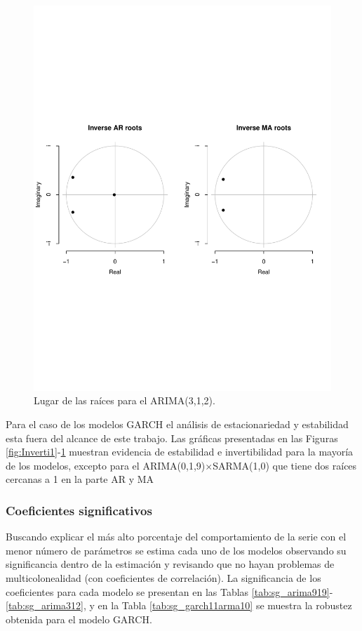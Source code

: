 \documentclass[conference]{IEEEtran}
\begin{document}
\begin{figure}
    \centering
    \includegraphics[width=\columnwidth]{figs/Arima312stationarity.pdf}
    \caption{Lugar de las raíces para el ARIMA(3,1,2).}
    \label{fig:Inverti4}
\end{figure}

Para el caso de los modelos GARCH el análisis de estacionariedad y estabilidad esta fuera del alcance de este trabajo. Las gráficas presentadas en las Figuras \ref{fig:Inverti1}-\ref{fig:Inverti4} muestran evidencia de estabilidad e invertibilidad para la mayoría de los modelos, excepto  para el ARIMA(0,1,9)$\times$SARMA(1,0) que tiene dos raíces cercanas a 1 en la parte AR y MA

\subsubsection{Coeficientes significativos} Buscando explicar el más alto porcentaje del comportamiento  de la serie con el menor número de parámetros se estima cada uno de los modelos observando su significancia dentro de la estimación y revisando que no hayan problemas de multicolonealidad (con coeficientes de correlación). La significancia de los coeficientes para cada modelo se presentan en las Tablas \ref{tab:sg_arima919}-\ref{tab:sg_arima312}, y en la Tabla \ref{tab:sg_garch11arma10} se muestra la robustez obtenida para el modelo GARCH.
\end{document}
